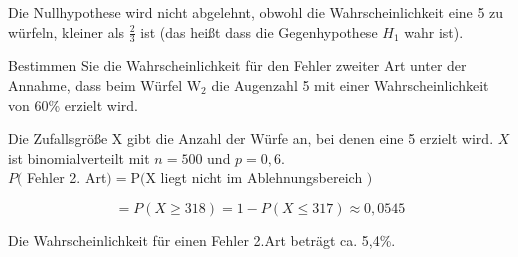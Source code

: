 \documentclass[10pt]{article}
\begin{document}
Die Nullhypothese wird nicht abgelehnt, obwohl die Wahrscheinlichkeit eine 5 zu würfeln, kleiner als $\frac{2}{3}$ ist (das heißt dass die Gegenhypothese $H_{1}$ wahr ist).

Bestimmen Sie die Wahrscheinlichkeit für den Fehler zweiter Art unter der Annahme, dass beim Würfel $\mathrm{W}_{2}$ die Augenzahl 5 mit einer Wahrscheinlichkeit von 60\% erzielt wird.

Die Zufallsgröße X gibt die Anzahl der Würfe an, bei denen eine 5 erzielt wird. $X$ ist binomialverteilt mit $n=500$ und $p=0,6$.\\
$P($ Fehler 2. Art$)=\mathrm{P}(\mathrm{X}$ liegt nicht im Ablehnungsbereich $)$

$$
=P(X \geq 318)=1-P(X \leq 317) \approx 0,0545
$$

Die Wahrscheinlichkeit für einen Fehler 2.Art beträgt ca. 5,4\%.
\end{document}
